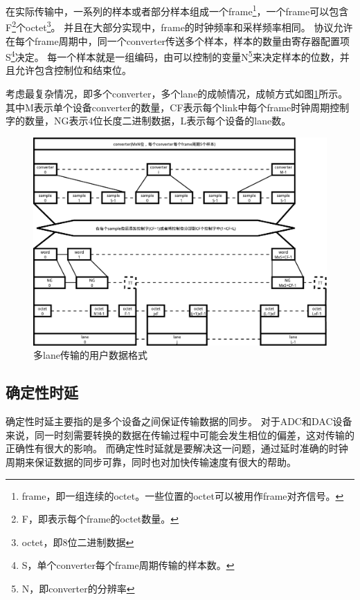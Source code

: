 \documentclass[UTF8]{ctexart}
\begin{document}
在实际传输中，一系列的样本或者部分样本组成一个frame\footnote{frame，即一组连续的octet。一些位置的octet可以被用作frame对齐信号。}，一个frame可以包含F\footnote{F，即表示每个frame的octet数量。}个octet\footnote{octet，即8位二进制数据}。
并且在大部分实现中，frame的时钟频率和采样频率相同。
协议允许在每个frame周期中，同一个converter传送多个样本，样本的数量由寄存器配置项S\footnote{S，单个converter每个frame周期传输的样本数。}决定。
每一个样本就是一组编码，由可以控制的变量N\footnote{N，即converter的分辨率}来决定样本的位数，并且允许包含控制位和结束位。

考虑最复杂情况，即多个converter，多个lane的成帧情况，成帧方式如图\ref{fig:user_data_format_for_multiple_lanes}所示。其中M表示单个设备converter的数量，CF表示每个link中每个frame时钟周期控制字的数量，NG表示4位长度二进制数据，L表示每个设备的lane数。

\begin{figure}[H]
\centering
\includegraphics[width=17cm]{./img/user_data_format_for_multiple_lanes.pdf}
\caption{多lane传输的用户数据格式}
\label{fig:user_data_format_for_multiple_lanes}
\end{figure}

\subsection{确定性时延}

确定性时延主要指的是多个设备之间保证传输数据的同步。
对于ADC和DAC设备来说，同一时刻需要转换的数据在传输过程中可能会发生相位的偏差，这对传输的正确性有很大的影响。
而确定性时延就是要解决这一问题，通过延时准确的时钟周期来保证数据的同步可靠，同时也对加快传输速度有很大的帮助。
\end{document}
